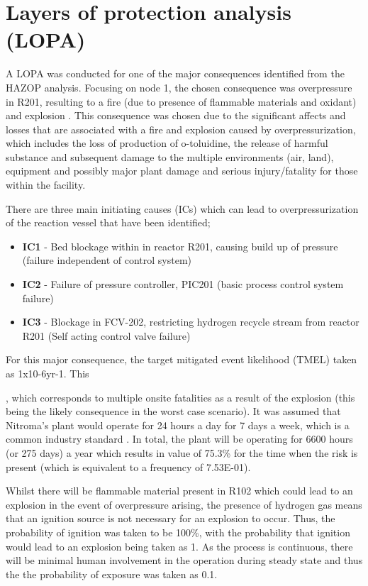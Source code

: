 \section{Layers of protection analysis (LOPA)}

A LOPA was conducted for one of the major consequences identified from the HAZOP analysis. Focusing on node 1, the chosen consequence was overpressure in R201, resulting to a fire (due to presence of flammable materials and oxidant) and explosion . This consequence was chosen due to the significant affects and losses that are associated with a fire and explosion caused by overpressurization, which includes the loss of production of o-toluidine, the release of harmful substance and subsequent damage to the multiple environments (air, land), equipment and possibly major plant damage and serious injury/fatality for those within the facility. 

There are three main initiating causes (ICs) which can lead to overpressurization of the reaction vessel that have been identified;

\begin{itemize}
\item \textbf{IC1} - Bed blockage within in reactor R201, causing build up of pressure (failure independent of control system)
\item \textbf{IC2} - Failure of pressure controller, PIC201 (basic process control system failure)
\item \textbf{IC3 }- Blockage in FCV-202, restricting hydrogen recycle stream from reactor R201 (Self acting control valve failure)

\end{itemize}
For this major consequence, the target mitigated event likelihood (TMEL) taken as 1x10-6yr-1. This 
 
 , which corresponds to multiple onsite fatalities as a result of the explosion (this being the likely consequence in the worst case scenario). It was assumed that Nitroma's plant would operate for 24 hours a day for 7 days a week, which is a common industry standard \cite{job_guide_chemical_2021}. In total, the plant will be operating for 6600 hours (or 275 days) a year which results in value of 75.3\% for the time when the risk is present (which is equivalent to a frequency of 7.53E-01).  
 
Whilst there will be flammable material present in R102 which could lead to an explosion in the event of overpressure arising, the presence of hydrogen gas means that an ignition source is not necessary for an explosion to occur. Thus, the probability of ignition was taken to be 100\%, with the probability that ignition would lead to an explosion being taken as 1. As the process is continuous, there will be minimal human involvement in the operation during steady state and thus the the probability of exposure was taken as 0.1. 
 
